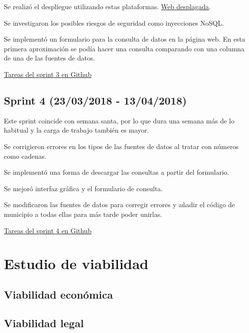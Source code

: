Se realizó el despliegue utilizando estas plataformas. \href{http://tfg-datos-publicos.nanoapp.io/}{Web desplagada}.

Se investigaron los posibles riesgos de seguridad como inyecciones NoSQL.

Se implementó un formulario para la consulta de datos en la página web. En esta primera aproximación se podía hacer una consulta comparando con una columna de una de las fuentes de datos.


\href{https://github.com/IvanArjona/TFG-Datos-publicos/milestone/4?closed=1}{Tareas del sprint 3 en Github}

\subsection{Sprint 4 (23/03/2018 - 13/04/2018)}

Este sprint coincide con semana santa, por lo que dura una semana más de lo habitual y la carga de trabajo también es mayor.

Se corrigieron errores en los tipos de las fuentes de datos al tratar con números como cadenas. 

Se implementó una forma de descargar las consultas a partir del formulario. 

Se mejoró interfaz gráfica y el formulario de consulta.

Se modificaron las fuentes de datos para corregir errores y añadir el código de municipio a todas ellas para más tarde poder unirlas.


\href{https://github.com/IvanArjona/TFG-Datos-publicos/milestone/5?closed=1}{Tareas del sprint 4 en Github}

\section{Estudio de viabilidad}

\subsection{Viabilidad económica}

\subsection{Viabilidad legal}


